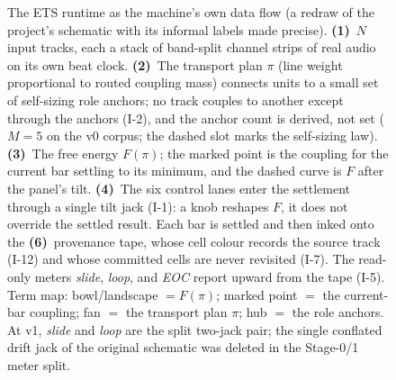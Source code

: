 \documentclass[11pt]{article}
\begin{document}
\begin{figure}[H]
{}
\caption{The ETS runtime as the machine's own data flow (a redraw of the
project's schematic with its informal labels made precise). \textbf{(1)}~$N$ input
tracks, each a stack of band-split channel strips of real audio on its own beat
clock. \textbf{(2)}~The transport plan $\pi$ (line weight proportional to routed
coupling mass) connects units to a small set of self-sizing role anchors; no track
couples to another except through the anchors (I-2), and the anchor count is
derived, not set ($M{=}5$ on the v0 corpus; the dashed slot marks the self-sizing
law). \textbf{(3)}~The free energy $F(\pi)$; the marked point is the coupling for
the current bar settling to its minimum, and the dashed curve is $F$ after the
panel's tilt. \textbf{(4)}~The six control lanes enter the settlement through a
single tilt jack (I-1): a knob reshapes $F$, it does not override the settled
result. Each bar is settled and then inked onto the \textbf{(6)}~provenance tape,
whose cell colour records the source track (I-12) and whose committed cells are
never revisited (I-7). The read-only meters \emph{slide}, \emph{loop}, and
\emph{EOC} report upward from the tape (I-5). Term map: bowl/landscape $=F(\pi)$;
marked point $=$ the current-bar coupling; fan $=$ the transport plan $\pi$; hub
$=$ the role anchors. At v1, \emph{slide} and \emph{loop} are the split two-jack
pair; the single conflated drift jack of the original schematic was deleted in the
Stage-0/1 meter split.}
\label{fig:machine}
\end{figure}
\end{document}
